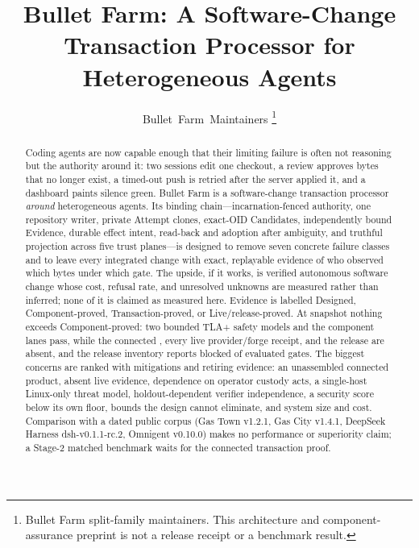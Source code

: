 \documentclass[journal]{IEEEtran}
\newcommand{\Designed}{\textsf{Designed}}
\newcommand{\ComponentProved}{\textsf{Component-proved}}
\newcommand{\TransactionProved}{\textsf{Transaction-proved}}
\newcommand{\LiveReleaseProved}{\textsf{Live/release-proved}}
\newcommand{\code}[1]{\texttt{\detokenize{#1}}}
\begin{document}
\title{Bullet Farm: A Software-Change Transaction Processor for Heterogeneous Agents}

\author{Bullet~Farm~Maintainers%
\thanks{Bullet Farm split-family maintainers. This architecture and component-assurance preprint is not a release receipt or a benchmark result.}%
}

\maketitle

\begin{abstract}
Coding agents are now capable enough that their limiting failure is often not
reasoning but the authority around it: two sessions edit one checkout, a
review approves bytes that no longer exist, a timed-out push is retried after
the server applied it, and a dashboard paints silence green. Bullet Farm is a
software-change transaction processor \emph{around} heterogeneous agents. Its
binding chain---incarnation-fenced authority, one repository writer, private
Attempt clones, exact-OID Candidates, independently bound Evidence, durable
effect intent, read-back and adoption after ambiguity, and truthful
\code{UNKNOWN} projection across five trust planes---is designed to remove
seven concrete failure classes and to leave every integrated change with
exact, replayable evidence of who observed which bytes under which gate. The
upside, if it works, is verified autonomous software change whose cost,
refusal rate, and unresolved unknowns are measured rather than inferred; none
of it is claimed as measured here. Evidence is labelled \Designed,
\ComponentProved, \TransactionProved, or \LiveReleaseProved. At snapshot
\EvidenceSnapshotId{} nothing exceeds \ComponentProved: two bounded TLA+
safety models and the component lanes pass, while the connected
\code{TRANSACTION_PROOF}, every live provider/forge receipt, and the release
are absent, and the release inventory reports \EvidenceReleaseBlocked{}
blocked of \EvidenceReleaseEvaluated{} evaluated gates. The biggest concerns
are ranked with mitigations and retiring evidence: an unassembled connected
product, absent live evidence, dependence on operator custody acts, a
single-host Linux-only threat model, holdout-dependent verifier independence,
a security score below its own floor, bounds the design cannot eliminate, and
system size and cost. Comparison with a dated public corpus (Gas Town v1.2.1,
Gas City v1.4.1, DeepSeek Harness dsh-v0.1.1-rc.2, Omnigent v0.10.0) makes no
performance or superiority claim; a Stage-2 matched benchmark waits for the
connected transaction proof.
\end{abstract}
\end{document}
